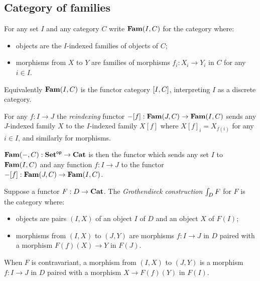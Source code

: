 \subsection{Category of families}

\begin{definition}
For any set $I$ and any category $C$ write $\mathbf{Fam}(I,C)$ for the category where:
\begin{itemize}
\item objects are the $I$-indexed families of objects of $C$;
\item morphisms from $X$ to $Y$ are families of morphisms $f_i: X_i \to Y_i$ in $C$ for any $i \in I$.
\end{itemize}
\end{definition}

\noindent Equivalently $\mathbf{Fam}(I,C)$ is the functor category $[I,C]$, interpreting $I$ as a discrete
category.

\begin{definition}[Reindexing]
For any $f: I \to J$ the \emph{reindexing} functor $-[f]: \mathbf{Fam}(J,C) \to \mathbf{Fam}(I,C)$ sends any
$J$-indexed family $X$ to the $I$-indexed family $X[f]$ where $X[f]_i = X_{f(i)}$ for any $i \in I$, and
similarly for morphisms.
\end{definition}

\begin{definition}
$\mathbf{Fam}(-,C): \mathbf{Set}^{\mathsf{op}} \to \mathbf{Cat}$ is then the functor which sends any set $I$ to $\mathbf{Fam}(I,C)$ and any function
$f: I \to J$ to the functor $-[f]: \mathbf{Fam}(J,C) \to \mathbf{Fam}(I,C)$.
\end{definition}

\begin{definition}
Suppose a functor $F: D \to \mathbf{Cat}$. The \emph{Grothendieck construction} $\int_{D}F$ for $F$ is the
category where:
\begin{itemize}
\item objects are pairs $(I, X)$ of an object $I$ of $D$ and an object $X$ of $F(I)$;
\item morphisms from $(I, X)$ to $(J, Y)$ are morphisms $f: I \to J$ in $D$ paired with a morphism $F(f)(X)
\to Y$ in $F(J)$.
\end{itemize}
\end{definition}

\noindent When $F$ is contravariant, a morphism from $(I, X)$ to $(J, Y)$ is a morphism $f: I \to J$ in $D$
paired with a morphism $X \to F(f)(Y)$ in $F(I)$.

